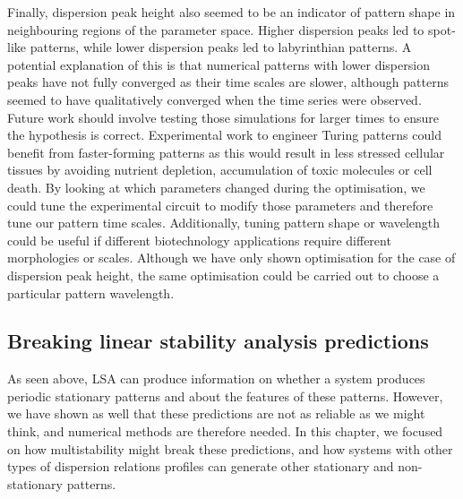 Finally, dispersion peak height also seemed to be an indicator of pattern shape in neighbouring regions of the parameter space.
Higher dispersion peaks led to spot-like patterns, while lower dispersion peaks led to labyrinthian patterns.
A potential explanation of this is that numerical patterns with lower dispersion peaks have not fully converged as their time scales are slower, although patterns seemed to have qualitatively converged when the time series were observed.
Future work should involve testing those simulations for larger times to ensure the hypothesis is correct.
%
Experimental work to engineer Turing patterns could benefit from faster-forming patterns as this would result in less stressed cellular tissues by avoiding nutrient depletion, accumulation of toxic molecules or cell death.
By looking at which parameters changed during the optimisation, we could tune the experimental circuit to modify those parameters and therefore tune our pattern time scales.
Additionally, tuning pattern shape or wavelength could be useful if different biotechnology applications require different morphologies or scales.
Although we have only shown optimisation for the case of dispersion peak height, the same optimisation could be carried out to choose a particular pattern wavelength.


\subsection*{Breaking linear stability analysis predictions}
As seen above, LSA can produce information on whether a system produces periodic stationary patterns and about the features of these patterns.
However, we have shown as well that these predictions are not as reliable as we might think, and numerical methods are therefore needed.
In this chapter, we focused on how multistability might break these predictions, and how systems with other types of dispersion relations profiles can generate other stationary and non-stationary patterns.

